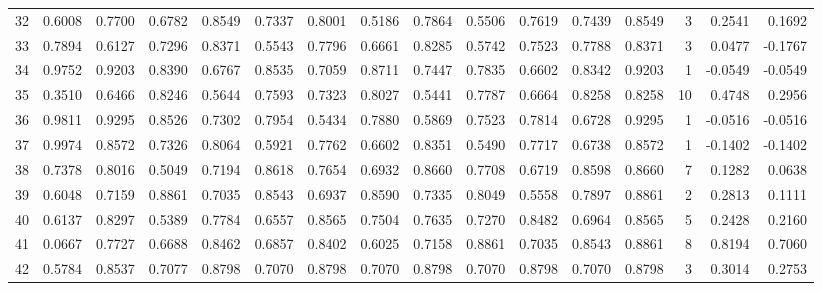 \begin{tabular}{lrrrrrrrrrrrrrrr}
32  &      0.6008 &  0.7700 &  0.6782 &  0.8549 &  0.7337 &  0.8001 &  0.5186 &  0.7864 &  0.5506 &  0.7619 &   0.7439 &     0.8549 &      3 &                    0.2541 &                     0.1692 \\
33  &      0.7894 &  0.6127 &  0.7296 &  0.8371 &  0.5543 &  0.7796 &  0.6661 &  0.8285 &  0.5742 &  0.7523 &   0.7788 &     0.8371 &      3 &                    0.0477 &                    -0.1767 \\
34  &      0.9752 &  0.9203 &  0.8390 &  0.6767 &  0.8535 &  0.7059 &  0.8711 &  0.7447 &  0.7835 &  0.6602 &   0.8342 &     0.9203 &      1 &                   -0.0549 &                    -0.0549 \\
35  &      0.3510 &  0.6466 &  0.8246 &  0.5644 &  0.7593 &  0.7323 &  0.8027 &  0.5441 &  0.7787 &  0.6664 &   0.8258 &     0.8258 &     10 &                    0.4748 &                     0.2956 \\
36  &      0.9811 &  0.9295 &  0.8526 &  0.7302 &  0.7954 &  0.5434 &  0.7880 &  0.5869 &  0.7523 &  0.7814 &   0.6728 &     0.9295 &      1 &                   -0.0516 &                    -0.0516 \\
37  &      0.9974 &  0.8572 &  0.7326 &  0.8064 &  0.5921 &  0.7762 &  0.6602 &  0.8351 &  0.5490 &  0.7717 &   0.6738 &     0.8572 &      1 &                   -0.1402 &                    -0.1402 \\
38  &      0.7378 &  0.8016 &  0.5049 &  0.7194 &  0.8618 &  0.7654 &  0.6932 &  0.8660 &  0.7708 &  0.6719 &   0.8598 &     0.8660 &      7 &                    0.1282 &                     0.0638 \\
39  &      0.6048 &  0.7159 &  0.8861 &  0.7035 &  0.8543 &  0.6937 &  0.8590 &  0.7335 &  0.8049 &  0.5558 &   0.7897 &     0.8861 &      2 &                    0.2813 &                     0.1111 \\
40  &      0.6137 &  0.8297 &  0.5389 &  0.7784 &  0.6557 &  0.8565 &  0.7504 &  0.7635 &  0.7270 &  0.8482 &   0.6964 &     0.8565 &      5 &                    0.2428 &                     0.2160 \\
41  &      0.0667 &  0.7727 &  0.6688 &  0.8462 &  0.6857 &  0.8402 &  0.6025 &  0.7158 &  0.8861 &  0.7035 &   0.8543 &     0.8861 &      8 &                    0.8194 &                     0.7060 \\
42  &      0.5784 &  0.8537 &  0.7077 &  0.8798 &  0.7070 &  0.8798 &  0.7070 &  0.8798 &  0.7070 &  0.8798 &   0.7070 &     0.8798 &      3 &                    0.3014 &                     0.2753 \\

\end{tabular}
